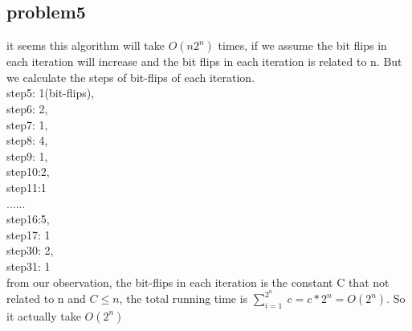 \documentclass[11pt]{article}
\begin{document}
\subsection{problem5}
it seems this algorithm will take $O(n2^n)$ times, if we assume the bit flips in each iteration will increase and  the bit flips in each iteration is related to n.
But we calculate the steps of bit-flips of each iteration.
\\step5: 1(bit-flips), \\ step6: 2, \\ step7: 1, \\ step8: 4, \\step9: 1, \\step10:2, \\step11:1 \\...... \\step16:5, \\step17: 1 \\step30: 2, \\step31: 1
\\from our observation, the bit-flips in each iteration is the constant C that not related to n and $C\leq n$, the total running time is $\sum _{i=1}^{2^n}\:c=c*2^n=O(2^n)$. So it actually take $O(2^n)$
\end{document}
